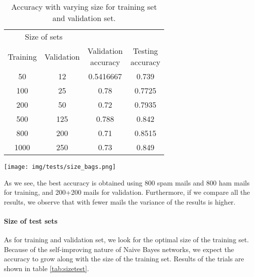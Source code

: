 \begin{center}
\begin{table}[h]
\begin{minipage}{.5\linewidth}
\begin{tabular}{cccc}
\toprule
\multicolumn{2}{c}{Size of sets} \\
\cmidrule(r){1-2}
Training & Validation & \shortstack{Validation\\ accuracy} & \shortstack{Testing\\ accuracy}\\
\midrule
50   & 12     & 0.5416667 & 0.739\\
100  & 25     & 0.78 & 0.7725 \\
200  & 50     & 0.72 & 0.7935 \\
500  & 125    & 0.788 & 0.842 \\
800  & 200    & 0.71 & 0.8515 \\
1000 & 250    & 0.73 & 0.849 \\
\bottomrule
\end{tabular}
\end{minipage}
\begin{minipage}{.5\linewidth}
\texttt{[image: img/tests/size\_bags.png]}
    \label{fig:sizebags}
\end{minipage}
\caption{Accuracy with varying size for training set and validation set.}
\label{tab:sizebags}
\end{table}
\end{center}

As we see, the best accuracy is obtained using 800 spam mails and 800 ham mails for training, and 200+200 mails for validation. Furthermore, if we compare all the results, we observe that with fewer mails the variance of the results is higher.

\paragraph{Size of test sets}
As for training and validation set, we look for the optimal size of the training set. Because of the self-improving nature of Naive Bayes networks, we expect the accuracy to grow along with the size of the training set. Results of the trials are shown in table \ref{tab:sizetest}.

